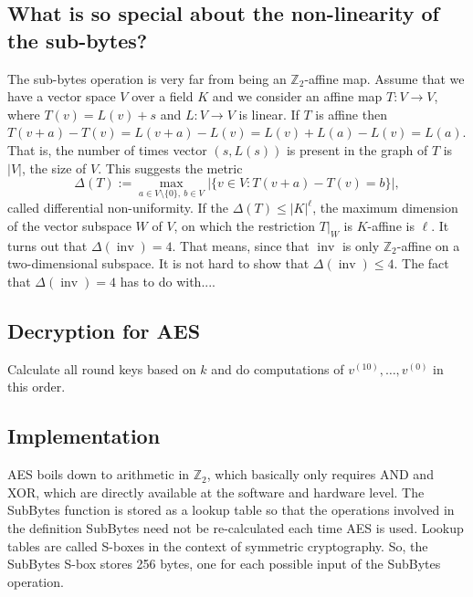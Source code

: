 \documentclass[11pt,a4paper]{amsart}
\newcommand{\Z}{\mathbb{Z}}
\newcommand{\inv}{\operatorname{inv}}
\begin{document}
\subsection*{What is so special about the non-linearity of the sub-bytes?} The sub-bytes operation is very far from being an $\Z_2$-affine map. Assume that we have a vector space $V$ over a field $K$ and we consider an affine map $T : V \to V$, where $T(v) = L(v) + s$ and $L : V \to V$ is linear. If $T$ is affine then $T(v+a) - T(v) = L(v+a) - L(v) = L(v) + L(a) - L(v) = L(a)$. That is, the number of times vector $(s,L(s))$ is present in the graph of $T$ is $|V|$, the size of $V$. This suggests the metric 
\[
\Delta(T) :=	\max_{a \in V \setminus \{0\}, \  b \in V}  | \{ v\in V \colon T(v+a) - T(v)  = b \} |, 
\]
called differential non-uniformity. 
If the $\Delta(T) \le |K|^\ell$, the maximum dimension of the vector  subspace $W$ of $V$, on which the restriction $T|_W$ is $K$-affine is $\ell$. It turns out that $\Delta(\inv) = 4$. That means, since that $\inv$ is only $\Z_2$-affine on a two-dimensional subspace. It is not hard to show that $\Delta(\inv) \le 4$. The fact that $\Delta(\inv) =4$ has to do with.... 

\subsection*{Decryption for AES} Calculate all round keys based on $k$ and do computations of $v^{(10)},\ldots, v^{(0)}$ in this order. 

\subsection*{Implementation} AES boils down to arithmetic in $\Z_2$, which basically only requires AND and XOR, which are directly available at the software and hardware level.  The SubBytes function is stored as a lookup table so that the operations involved in the definition SubBytes need not be re-calculated each time AES is used.  Lookup tables are called S-boxes in the context of symmetric cryptography. So, the SubBytes S-box stores 256 bytes, one for each possible input of the SubBytes operation. 
\end{document}
